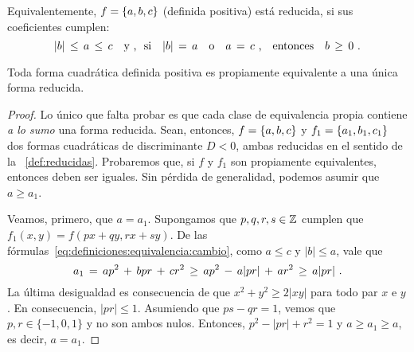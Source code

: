 \begin{obsReducidas}\label{obs:reducidas:definicion}
	Equivalentemente, $f=\left\{a,b,c\right\}$ (definida positiva)
	est\'a reducida, si sus coeficientes cumplen:
	\begin{displaymath}
		|b|\,\leq\,a\,\leq\,c\quad\text{y~,~~si}\quad
		|b|\,=\,a\quad\text{o}\quad a\,=\,c\text{ ,}
		\quad\text{entonces}\quad
		b\,\geq\,0
		\text{ .}
	\end{displaymath}
\end{obsReducidas}

\begin{teoReducidas}\label{teo:reducidas}
	Toda forma cuadr\'atica definida positiva es
	propiamente equivalente a una \'unica forma reducida.
\end{teoReducidas}

\begin{proof}
	Lo \'unico que falta probar es que cada clase de equivalencia
	propia contiene \emph{a lo sumo} una forma reducida.
	Sean, entonces, $f=\left\{a,b,c\right\}$ y $f_1=\left\{a_1,b_1,c_1\right\}$
	dos formas cuadr\'aticas de discriminante $D<0$, ambas reducidas
	en el sentido de la ~\ref{def:reducidas}.
	Probaremos que, si $f$ y $f_1$ son propiamente equivalentes,
	entonces deben ser iguales.
	Sin p\'erdida de generalidad, podemos asumir que $a\geq a_1$.	

	Veamos, primero, que $a=a_1$. Supongamos que $p,q,r,s\in\mathbb{Z}$
	cumplen que
	\begin{math}
		f_1(x,y)=f(px+qy,rx+sy)
	\end{math}.
	De las f\'ormulas~\eqref{eq:definiciones:equivalencia:cambio},
	como $a\leq c$ y $|b|\leq a$, vale que
	\begin{displaymath}
		a_1\,=\,ap^2\,+\,bpr\,+\,cr^2
		\,\geq\,ap^2\,-\,a|pr|\,+\,ar^2\,\geq\,a|pr|
		\text{ .}
	\end{displaymath}
	La \'ultima desigualdad es consecuencia de que
	$x^2+y^2\geq 2|xy|$ para todo par $x$ e $y$. En consecuencia,
	$|pr|\leq 1$. Asumiendo que $ps-qr=1$, vemos que
	$p,r\in\{-1,0,1\}$ y no son ambos nulos.
	Entonces, $p^2-|pr|+r^2=1$ y $a\geq a_1\geq a$, es decir, $a=a_1$.


\end{proof}
